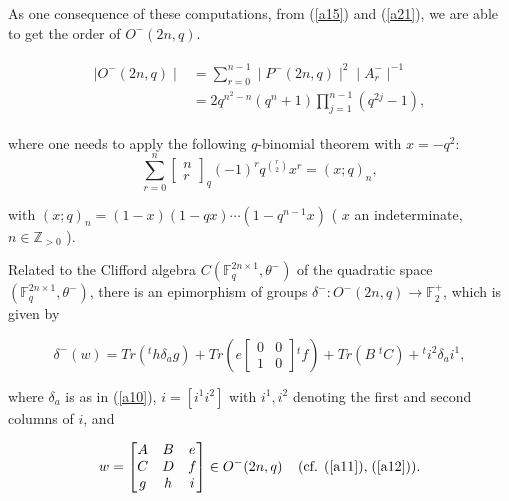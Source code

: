 \documentclass[a4,12pt]{elsart}
\begin{document}
As one consequence of these computations, from (\ref{a15}) and
(\ref{a21}), we are able to get the order of $O^-(2n,q )$.

\begin{align}\label{a22}
\begin{split}
\mid O^-(2n,q) \mid &= \sum_{r=0}^{n-1} \mid P^-(2n,q)\mid^2 \mid
A_r^- \mid ^{-1}\\
                    
                    &= 2q^{n^2-n}(q^n + 1) \prod_{j=1}^{n-1}
                    (q^{2j} - 1),
\end{split}
\end{align}

where one needs to apply the following $q$-binomial theorem with
$x=-q^{2}$:
\[
\sum_{r=0}^n \left[ \substack{n \\ r}
 \right]_q (-1)^r q^{{r \choose 2}} x^r = (x;q)_n,
\]

with $(x;q)_n = (1-x)(1-qx)\cdots(1-q^{n-1}x)$ ( $x$ an
indeterminate, $n \in \mathbb{Z}_{>0}$ ).

Related to the Clifford algebra $C({\mathbb{F}}_q^{2n \times 1},\theta^{-})$
of the quadratic space $({\mathbb{F}}_q^{2n \times 1}, \theta^{-})$, there is
an epimorphism of groups $\delta^-:O^-(2n,q) \rightarrow {\mathbb{F}}_2^+$,
which is given by

\begin{equation*}
\delta^-(w)=Tr({}^t h \delta_a g )+Tr(e
\begin{bmatrix}
   0   & 0 \\
   1   & 0
\end{bmatrix}{}^t f )+Tr(B \;{}^t C)+{}^t i^2 \delta_a i^1,
\end{equation*}

where $\delta_a $ is as in (\ref{a10}), $ i=[i^1 i^2]$ with
$i^1,i^2$ denoting the first and second columns of $i$, and

\begin{equation*}
w =
\begin{bmatrix}
   A  & B & e \\
   C & D & f \\
   g  & h &i
\end{bmatrix} \in O^{-}(2n,q)  \;\;\;\; \textrm{(cf. (\ref{a11}),\;(\ref{a12}))}.
\end{equation*}
\end{document}

